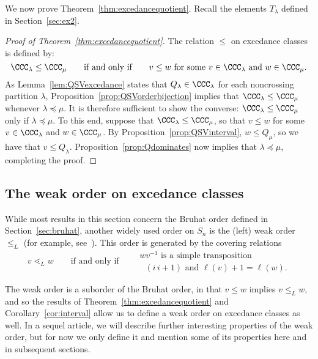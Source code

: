\documentclass[12pt]{amsart}
\theoremstyle{definition}
\theoremstyle{remark}
\numberwithin{equation}{section}
\begin{document}
We now prove Theorem~\ref{thm:excedancequotient}.  Recall the elements $T_{\lambda}$ defined in Section~\ref{sec:ex2}.

\begin{proof}[Proof of Theorem~\ref{thm:excedancequotient}]
The relation $\le$ on excedance classes is defined by:
\[
\CCC_{\lambda} \le \CCC_{\mu}
\qquad\text{if and only if}\qquad
\text{$v \le w$ for some $v \in \CCC_{\lambda}$ and $w \in \CCC_{\mu}$}.
\]
As Lemma~\ref{lem:QSVexcedance} states that $Q_{\lambda} \in \CCC_{\lambda}$ for each noncrossing partition $\lambda$, Proposition~\ref{prop:QSVorderbijection} implies that $\CCC_{\lambda} \le \CCC_{\mu}$ whenever $\lambda \preceq \mu$.  It is therefore sufficient to show the converse: $\CCC_{\lambda} \le \CCC_{\mu}$ only if $\lambda \preceq \mu$.  To this end, suppose that $\CCC_{\lambda} \le \CCC_{\mu}$, so that $v \le w$ for some $v \in \CCC_{\lambda}$ and $w \in \CCC_{\mu}$.  By Proposition~\ref{prop:QSVinterval}, $w \le Q_{\mu}$, so we have that $v \le Q_{\lambda}$.   Proposition~\ref{prop:Qdominates} now implies that $\lambda \preceq \mu$, completing the proof.
\end{proof}


\subsection{The weak order on excedance classes}
\label{sec:weakorder}

While most results in this section concern the Bruhat order defined in Section~\ref{sec:bruhat}, another widely used order on $S_{n}$ is the (left) weak order $\le_{L}$ (for example, see~\cite[Chapter 3]{BjornerBrenti}).  This order is generated by the covering relations
\[
v \lessdot_{L} w \qquad\text{if and only if} \qquad 
\begin{array}{c}
\text{$wv^{-1}$ is a simple transposition} \\ \text{ $(i\,i+1)$ and $\ell(v) +1 = \ell(w)$}.
\end{array}
\]

The weak order is a suborder of the Bruhat order, in that $v \le w$ implies $v \le_{L} w$, and so the results of Theorem~\ref{thm:excedancequotient} and Corollary~\ref{cor:interval} allow us to define a weak order on excedance classes as well.  In a sequel article, we will describe further interesting properties of the weak order, but for now we only define it and mention some of its properties here and in subsequent sections.
\end{document}
